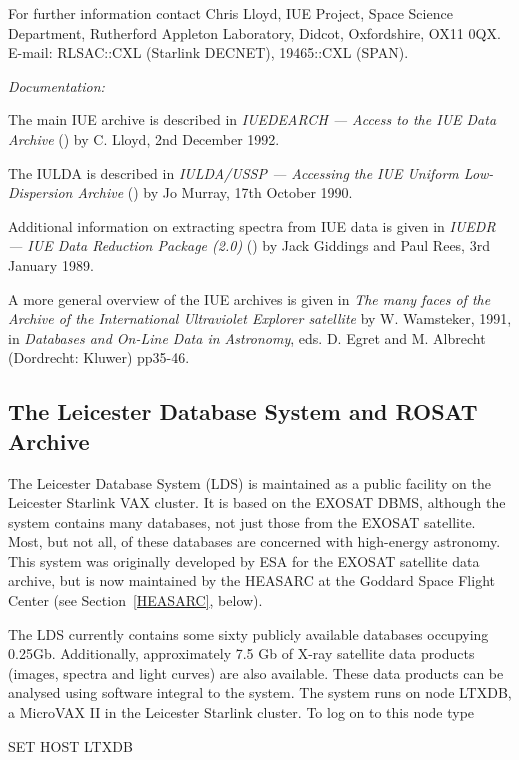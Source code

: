 \documentclass[twoside,11pt,nolof]{starlink}
\begin{document}
For further information contact Chris Lloyd, IUE Project, Space Science
Department, Rutherford Appleton Laboratory, Didcot, Oxfordshire, OX11
0QX. E-mail: RLSAC::CXL (Starlink DECNET), 19465::CXL (SPAN).

\textit{Documentation:}

The main IUE archive is described in \textit{IUEDEARCH --- Access to the
IUE Data Archive}
() by C. Lloyd, 2nd December 1992.

The IULDA is described in \textit{IULDA/USSP --- Accessing the IUE Uniform
Low-Dispersion Archive} () by Jo Murray,
17th October 1990.

Additional information on extracting spectra from IUE data is given in
\textit{IUEDR --- IUE Data Reduction Package (2.0)}
() by Jack
Giddings and Paul Rees, 3rd January 1989.

A more general overview of the IUE archives is given in \textit{The many
faces of the Archive of the International Ultraviolet Explorer
satellite} by W. Wamsteker, 1991, in \textit{Databases and On-Line Data
in Astronomy}, eds. D. Egret and M. Albrecht (Dordrecht: Kluwer)
pp35-46.

\subsection{The Leicester Database System and ROSAT Archive
\label{LEICS}}

The Leicester Database System (LDS) is maintained as a public facility
on the Leicester Starlink VAX cluster. It is based on the EXOSAT DBMS,
although the system contains many databases, not just those from the
EXOSAT satellite. Most, but not all, of these databases are concerned
with high-energy astronomy. This system was originally developed by ESA
for the EXOSAT satellite data archive, but is now maintained by the
HEASARC at the Goddard Space Flight Center (see Section~\ref{HEASARC},
below).

The LDS currently contains some sixty publicly available databases
occupying 0.25Gb. Additionally, approximately 7.5 Gb of X-ray satellite
data products (images, spectra and light curves) are also available.
These data products can be analysed using software integral to the
system. The system runs on node LTXDB, a MicroVAX II in the Leicester
Starlink cluster. To log on to this node type

\begin{terminalv}
    SET  HOST  LTXDB
\end{terminalv}
\end{document}
